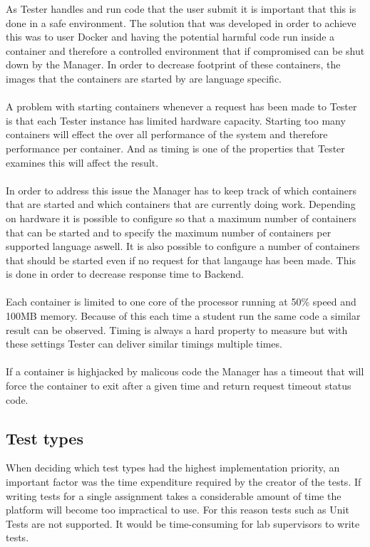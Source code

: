 As Tester handles and run code that the user submit it is important that this is
done in a safe environment. The solution that was developed in order to achieve
this was to user Docker and having the potential harmful code run inside a container
and therefore a controlled environment that if compromised can be shut down by the
Manager. In order to decrease footprint of these containers, the images that the
containers are started by are language specific.\\
\\
A problem with starting containers whenever a request has been made to Tester
is that each Tester instance has limited hardware capacity. Starting too many
containers will effect the over all performance of the system and therefore
performance per container. And as timing is one of the properties that Tester
examines this will affect the result.\\
\\
In order to address this issue the Manager has to keep track of which containers
that are started and which containers that are currently doing work. Depending on
hardware it is possible to configure so that a maximum number of containers that
can be started and to specify the maximum number of containers
per supported language aswell. It is also possible to configure a number of containers
that should be started even if no request for that langauge has been made. This
is done in order to decrease response time to Backend.\\
\\
Each container is limited to one core of the processor running at 50\% speed and
100MB memory. Because of this each time a student run the same code a similar
result can be observed. Timing is always a hard property to measure but with
these settings Tester can deliver similar timings multiple times.\\
\\
If a container is highjacked by malicous code the Manager has a timeout that will
force the container to exit after a given time and return request timeout status code.




\subsection{Test types}
When deciding which test types had the highest implementation priority, an important factor was the time expenditure required by the creator of the tests. If writing tests for a single assignment takes a considerable amount of time the platform will become too impractical to use. For this reason tests such as Unit Tests are not supported. It would be time-consuming for lab supervisors to write tests. %


